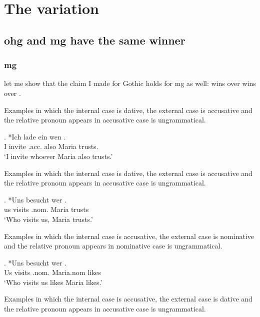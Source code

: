 
\chapter{The variation}

\section{\ac{ohg} and \ac{mg} have the same winner}

\subsection{\ac{mg}}

let me show that the claim I made for Gothic holds for \ac{mg} as well:  wins over  wins over .

Examples in which the internal case is dative, the external case is accusative and the relative pronoun appears in accusative case is ungrammatical.

\exg. *Ich {lade ein} wen   . \\
 I invite\scsub{[acc]} .\ac{acc}. also Maria trusts\scsub{[dat]}.\\
 `I invite whoever Maria also trusts.' \label{ex:mg-acc-dat-u}

Examples in which the internal case is dative, the external case is accusative and the relative pronoun appears in accusative case is ungrammatical.

\exg. *Uns besucht wer  .\\
 us visits\scsub{[nom]} .\ac{nom}. Maria trusts\scsub{[dat]}\\
 `Who visits us, Maria trusts.' 

Examples in which the internal case is accusative, the external case is nominative and the relative pronoun appears in nominative case is ungrammatical.

\exg. *Uns besucht wer  .\\
 Us visits\scsub{[nom]} .\ac{nom}. Maria.\ac{nom} likes\scsub{[acc]}\\
 `Who visits us likes Maria likes.' \label{ex:mg-nom-acc-u}

Examples in which the internal case is accusative, the external case is dative and the relative pronoun appears in accusative case is ungrammatical.

